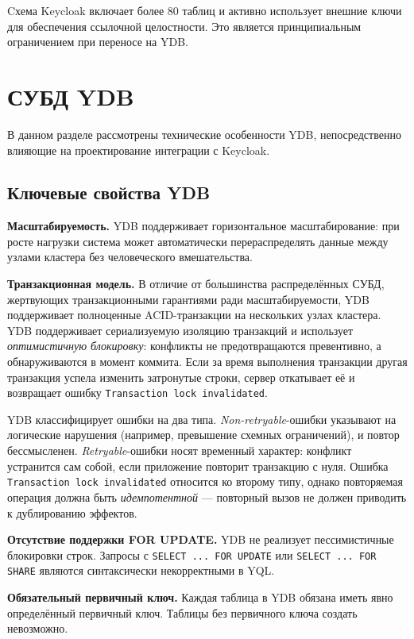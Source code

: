 \documentclass[times]{itmo-student-thesis}
\begin{document}
Cхема Keycloak включает более 80 таблиц и активно использует внешние ключи для обеспечения ссылочной целостности. 
Это является принципиальным ограничением при переносе на YDB.

\section{СУБД YDB}
В данном разделе рассмотрены технические особенности YDB, непосредственно
влияющие на проектирование интеграции с Keycloak.

\subsection{Ключевые свойства YDB}

\textbf{Масштабируемость.}
YDB поддерживает горизонтальное масштабирование: при росте нагрузки система может
автоматически перераспределять данные между узлами кластера без человеческого вмешательства.

\textbf{Транзакционная модель.}
В отличие от большинства распределённых СУБД, жертвующих транзакционными
гарантиями ради масштабируемости, YDB поддерживает полноценные ACID-транзакции
на нескольких узлах кластера. YDB поддерживает сериализуемую изоляцию транзакций и использует
\textit{оптимистичную блокировку}: конфликты не предотвращаются превентивно, а обнаруживаются
в момент коммита. Если за время выполнения транзакции другая транзакция успела изменить
затронутые строки, сервер откатывает её и возвращает ошибку \texttt{Transaction lock invalidated}.

YDB классифицирует ошибки на два типа. \textit{Non-retryable}-ошибки указывают на логические
нарушения (например, превышение схемных ограничений), и повтор бессмысленен.
\textit{Retryable}-ошибки носят временный характер: конфликт устранится сам собой, если
приложение повторит транзакцию с нуля. Ошибка \texttt{Transaction lock invalidated} относится
ко второму типу, однако повторяемая операция должна быть \textit{идемпотентной} ---
повторный вызов не должен приводить к дублированию эффектов.

\textbf{Отсутствие поддержки FOR UPDATE.} YDB не реализует пессимистичные блокировки строк.
Запросы с \texttt{SELECT ... FOR UPDATE} или \texttt{SELECT ... FOR SHARE} являются синтаксически некорректными в YQL.

\textbf{Обязательный первичный ключ.} Каждая таблица в YDB обязана иметь явно определённый первичный ключ.
Таблицы без первичного ключа создать невозможно.
\end{document}

